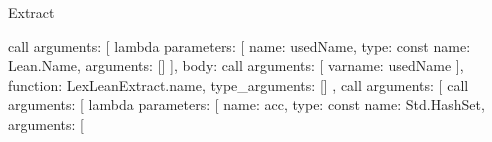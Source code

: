 \begin{lexlean}{Extract}
\begin{toolingmodule}
{{{{{{{{{{{{{{{{{{{                                                                call{
                                                                  arguments: [
                                                                    lambda{
                                                                      parameters: [
                                                                        {
                                                                          name: usedName,
                                                                          type: const{
                                                                            name: Lean.Name,
                                                                            arguments: []
                                                                          }
                                                                        }
                                                                      ],
                                                                      body: call{
                                                                        arguments: [
                                                                          var{name: usedName}
                                                                        ],
                                                                        function: LexLeanExtract.name,
                                                                        type_arguments: []
                                                                      }
                                                                    },
                                                                    call{
                                                                      arguments: [
                                                                        call{
                                                                          arguments: [
                                                                            lambda{
                                                                              parameters: [
                                                                                {
                                                                                  name: acc,
                                                                                  type: const{
                                                                                    name: Std.HashSet,
                                                                                    arguments: [
}}}}}}}}}}}}}}}}}}}}}}}}}
\end{toolingmodule}
\end{lexlean}
